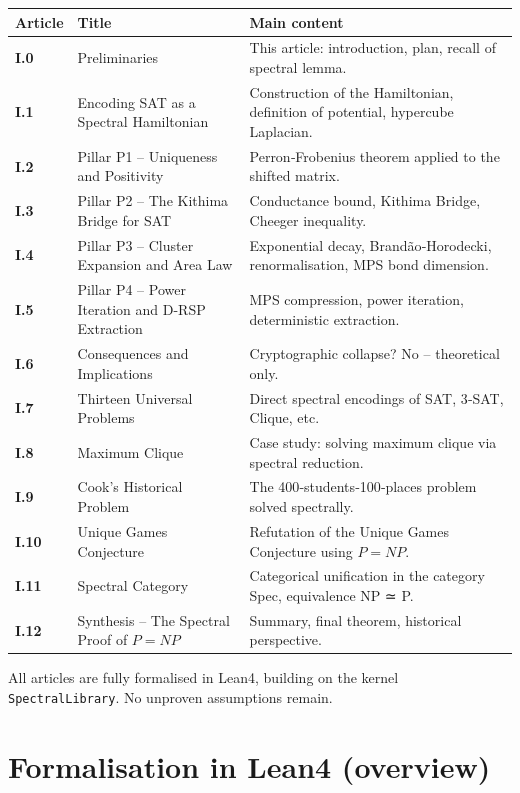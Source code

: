 \documentclass[11pt,a4paper]{article}
\begin{document}
\begin{center}
\small
\begin{tabular}{@{}>{\bfseries}l>{\raggedright\arraybackslash}p{5cm}>{\raggedright\arraybackslash}p{6cm}@{}}
\toprule
\textbf{Article} & \textbf{Title} & \textbf{Main content} \\
\midrule
I.0 & Preliminaries & This article: introduction, plan, recall of spectral lemma. \\
I.1 & Encoding SAT as a Spectral Hamiltonian & Construction of the Hamiltonian, definition of potential, hypercube Laplacian. \\
I.2 & Pillar P1 – Uniqueness and Positivity & Perron‑Frobenius theorem applied to the shifted matrix. \\
I.3 & Pillar P2 – The Kithima Bridge for SAT & Conductance bound, Kithima Bridge, Cheeger inequality. \\
I.4 & Pillar P3 – Cluster Expansion and Area Law & Exponential decay, Brandão‑Horodecki, renormalisation, MPS bond dimension. \\
I.5 & Pillar P4 – Power Iteration and D-RSP Extraction & MPS compression, power iteration, deterministic extraction. \\
I.6 & Consequences and Implications & Cryptographic collapse? No – theoretical only. \\
I.7 & Thirteen Universal Problems & Direct spectral encodings of SAT, 3‑SAT, Clique, etc. \\
I.8 & Maximum Clique & Case study: solving maximum clique via spectral reduction. \\
I.9 & Cook's Historical Problem & The 400‑students‑100‑places problem solved spectrally. \\
I.10 & Unique Games Conjecture & Refutation of the Unique Games Conjecture using \(P = NP\). \\
I.11 & Spectral Category & Categorical unification in the category Spec, equivalence NP ≃ P. \\
I.12 & Synthesis – The Spectral Proof of \(P = NP\) & Summary, final theorem, historical perspective. \\
\bottomrule
\end{tabular}
\normalsize
\end{center}

All articles are fully formalised in Lean4, building on the kernel \texttt{SpectralLibrary}. No unproven assumptions remain.

\section{Formalisation in Lean4 (overview)}
\end{document}
